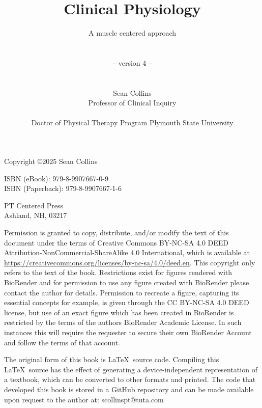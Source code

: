 \documentclass[graybox,envcountchap,sectrefs]{svmono}
\begin{document}
\author{}

\title{Clinical Physiology}
\subtitle{A muscle centered approach \\ \\ \\ -- version 4 -- \\ \\ \\ \normalsize{Sean Collins} \\ \normalsize{Professor of Clinical Inquiry} \\ \\ \normalsize{Doctor of Physical Therapy Program} \normalsize{Plymouth State University} }

\maketitle

\pagebreak
\thispagestyle{empty}
\begin{flushleft}
Copyright \copyright 2025 Sean Collins \\

\vspace{0.2in}

ISBN (eBook): 979-8-9907667-0-9 \\
ISBN (Paperback): 979-8-9907667-1-6

\vspace{0.2in}

PT Centered Press       \\
Ashland, NH, 03217

\vspace{0.2in}

Permission is granted to copy, distribute, and/or modify the text of this document under the terms of Creative Commons BY-NC-SA 4.0 DEED
Attribution-NonCommercial-ShareAlike 4.0 International, which is available at \url{https://creativecommons.org/licenses/by-nc-sa/4.0/deed.en}. This copyright only refers to the text of the book. Restrictions exist for figures rendered with BioRender and for permission to use any figure created with BioRender please contact the author for details. Permission to recreate a figure, capturing its essential concepts for example, is given through the CC BY-NC-SA 4.0 DEED license, but use of an exact figure which has been created in BioRender is restricted by the terms of the authors BioRender Academic License. In such instances this will require the requester to secure their own BioRender Account and follow the terms of that account.

\vspace{0.2in}

The original form of this book is \LaTeX\ source code.  Compiling this \LaTeX\ source has the effect of generating a device-independent representation of a textbook, which can be converted to other formats and printed. The code that developed this book is stored in a GitHub repository and can be made available upon request to the author at: scollinspt@tuta.com

\end{flushleft}
\end{document}
